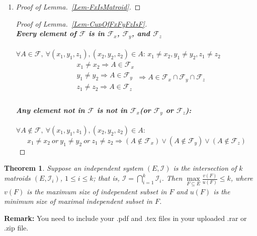\documentclass[12pt,a4paper]{article}
\makeatletter
\newtheorem{theorem}{Theorem}
\newtheorem*{solution}{Solution}
\theoremstyle{definition}
\renewenvironment{solution}[1][Solution] {\par\pushQED{\qed}\normalfont\topsep6\p@\@plus6\p@\relax\trivlist\item[\hskip\labelsep\bfseries#1\@addpunct{.}]\ignorespaces}{\popQED\endtrivlist\@endpefalse} \makeatother
\makeatother
\begin{document}
\begin{enumerate}
\begin{enumerate}
\begin{solution}
\begin{enumerate}
\begin{proof}[Proof of Lemma.~\ref{Lem-FxIsMatroid}]
			\end{proof}
			\begin{proof}[Proof of Lemma.~\ref{Lem-CupOfFxFyFzIsF}]
			~\\
			\textbf{\textit{Every element of $\mathcal{F}$ is in $\mathcal{F}_x$, $\mathcal{F}_y$, and $\mathcal{F}_z$}}
			\\
			\\
			$\forall A \in \mathcal{F},\ \forall (x_1,y_1,z_1),(x_2,y_2,z_2)\in A$: $x_1\neq x_2,y_1\neq y_2,z_1\neq z_2$
			\begin{equation}
			\begin{split}
			& x_1\neq x_2 \Rightarrow A\in \mathcal{F}_x\\
			& y_1\neq y_2 \Rightarrow A\in \mathcal{F}_y\\
			& z_1\neq z_2 \Rightarrow A\in \mathcal{F}_z\\			
			\end{split}
			\Rightarrow A\in \mathcal{F}_x\cap \mathcal{F}_y \cap \mathcal{F}_z
			\end{equation}
			\\
			\textbf{\textit{Any element not in $\mathcal{F}$ is not in $\mathcal{F}_x$(or $\mathcal{F}_y$ or $\mathcal{F}_z$):}}\
			\\
			\\
			$\forall A\notin \mathcal{F},\ \forall (x_1,y_1,z_1),(x_2,y_2,z_2)\in A:$
			$$x_1\neq x_2 \ or\ y_1\neq y_2\ or \ z_1\neq z_2\Rightarrow (A\notin \mathcal{F}_x)\vee (A\notin \mathcal{F}_y )\vee( A\notin \mathcal{F}_z)$$ 
			\end{proof}
    	    \end{enumerate}
    	    \end{solution}
    \end{enumerate}
    \begin{theorem} \label{Thm-Intersect}
        Suppose an independent system $(E, \mathcal{I})$ is the intersection of $k$ matroids $\left(E, \mathcal{I}_{i}\right)$, $1 \leq i \leq k$; that is, $\mathcal{I}=\bigcap_{i=1}^{k} \mathcal{I}_{i}$. Then $\max\limits_{F \subseteq E} \frac{v(F)}{u(F)} \leq k$, where $v(F)$ is the maximum size of independent subset in $F$ and $u(F)$ is the minimum size of maximal independent subset in $F$.
    \end{theorem}    
\end{enumerate}

\vspace{20pt}

\textbf{Remark:} You need to include your .pdf and .tex files in your uploaded .rar or .zip file.

\end{document}
